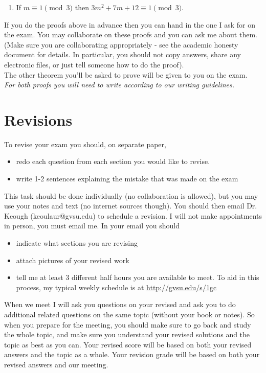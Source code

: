 \documentclass[12pt]{amsart}
\theoremstyle{definition}
\begin{document}
\begin{enumerate}
\begin{enumerate}
\item If $m\equiv 1 \pmod{3}$ then $3m^2+7m+12 \equiv 1 \pmod{3}$.

\end{enumerate}
 If you do the proofs above in advance then you can hand in the one I ask for on the exam. You may collaborate on these proofs and you can ask me about them. (Make sure you are collaborating appropriately - see the academic honesty document for details. In particular, you should not copy answers, share any electronic files, or just tell someone how to do the proof).\\
 
\noindent The other theorem you'll be asked to prove will be given to you on the exam.\\
  
\noindent \emph{ For both proofs you will need to write according to our writing guidelines.}
\vfill
\end{enumerate}

\newpage

\section{Revisions}

\noindent To revise your exam you should, on separate paper, 
\begin{itemize}
\item redo each question from each section you would like to revise. 
\item write 1-2 sentences explaining the mistake that was made on the exam
\end{itemize}
This task should be done individually (no collaboration is allowed), but you may use your notes and text (no internet sources though). You should then email Dr. Keough (keoulaur@gvsu.edu) to schedule a revision. I will not make appointments in person, you must email me. In your email you should  
\begin{itemize}
\item indicate what sections you are revising
\item attach pictures of your revised work
\item tell me at least 3 different half hours you are available to meet. To aid in this process, my typical weekly schedule is at \url{http://gvsu.edu/s/1gc}
\end{itemize}

When we meet I will ask you questions on your revised and ask you to do additional related questions on the same topic (without your book or notes). So when you prepare for the meeting, you should make sure to go back and study the whole topic, and make sure you understand your revised solutions and the topic as best as you can. Your revised score will be based on both your revised answers and the topic as a whole. Your revision grade will be based on both your revised answers and our meeting.\\
\end{document}
